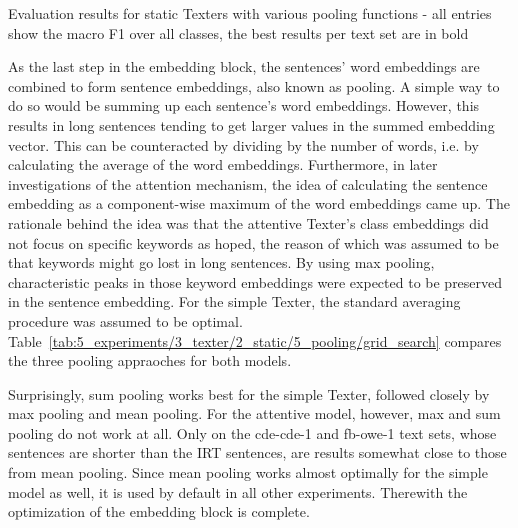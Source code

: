 \begin{table}[h]
    \centering
    
    \caption{Evaluation results for static Texters with various pooling functions - all entries show the macro F1 over all classes, the best results per text set are in bold}
    \label{tab:5_experiments/3_texter/2_static/5_pooling/grid_search}
\end{table}

As the last step in the embedding block, the sentences' word embeddings are combined to form sentence embeddings, also known as pooling. A simple way to do so would be summing up each sentence's word embeddings. However, this results in long sentences tending to get larger values in the summed embedding vector. This can be counteracted by dividing by the number of words, i.e. by calculating the average of the word embeddings. Furthermore, in later investigations of the attention mechanism, the idea of calculating the sentence embedding as a component-wise maximum of the word embeddings came up. The rationale behind the idea was that the attentive Texter's class embeddings did not focus on specific keywords as hoped, the reason of which was assumed to be that keywords might go lost in long sentences. By using max pooling, characteristic peaks in those keyword embeddings were expected to be preserved in the sentence embedding. For the simple Texter, the standard averaging procedure was assumed to be optimal. Table~\ref{tab:5_experiments/3_texter/2_static/5_pooling/grid_search} compares the three pooling appraoches for both models.

Surprisingly, sum pooling works best for the simple Texter, followed closely by max pooling and mean pooling. For the attentive model, however, max and sum pooling do not work at all. Only on the cde-cde-1 and fb-owe-1 text sets, whose sentences are shorter than the IRT sentences, are results somewhat close to those from mean pooling. Since mean pooling works almost optimally for the simple model as well, it is used by default in all other experiments. Therewith the optimization of the embedding block is complete.
